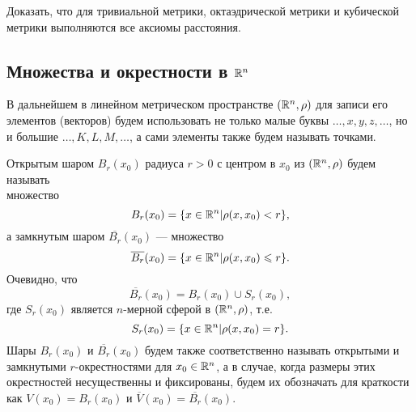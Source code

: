 \begin{exercise}
    Доказать, что для тривиальной метрики, октаэдрической метрики и кубической метрики выполняются все аксиомы расстояния.
\end{exercise}

\subsection{Множества и окрестности в $ \mathbb{R}^n $}

В дальнейшем в линейном метрическом пространстве $\left( \mathbb{R}^n, \rho \right)$ для записи его элементов (векторов) будем использовать не только малые буквы
$\ldots, x, y, z, \ldots$, но и большие $\ldots, K, L, M, \ldots$, а сами элементы также будем называть точками.

Открытым шаром $B_r (x_0)$ радиуса $r > 0$ с центром в $x_0$ из $\left( \mathbb{R}^n, \rho \right)$ будем называть \\множество
\begin{equation*}
	B_r (x_0) = \{x \in \mathbb{R}^n | \rho (x, x_0) < r\},
\end{equation*}
а замкнутым шаром $\overline{B_r}(x_0)$ — множество
\begin{equation*}
\overline{B_r}(x_0) = \{x \in \mathbb{R}^n | \rho (x, x_0) \leqslant r\}.
\end{equation*}
Очевидно, что
\begin{equation*}
\overline{B_r}(x_0) = B_r (x_0) \cup S_r (x_0),
\end{equation*}
где $S_r (x_0)$ является $n$-мерной сферой в $\left( \mathbb{R}^n, \rho \right)$, т.е.
\begin{equation*}
S_r (x_0) = \{x \in \mathbb{R}^n | \rho (x, x_0) = r\}.
\end{equation*}
Шары $B_r (x_0)$ и $\overline{B_r}(x_0)$ будем также соответственно называть открытыми и замкнутыми $r$-окрестностями для $x_0 \in \mathbb{R}^n$, а в случае, когда размеры этих окрестностей несущественны и фиксированы, будем их обозначать для краткости как $V(x_0) = B_r (x_0)$ и $ \overline{V}(x_0) = \overline{B_r}(x_0)$.

